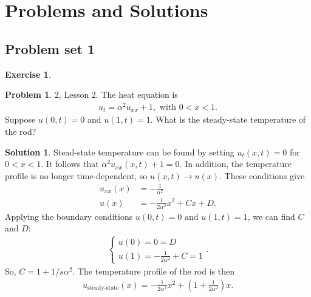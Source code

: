 \documentclass{article}
\theoremstyle{definition}
\newtheorem*{prob*}{Problem}
\newtheorem{exer}{Exercise}[section]
\newtheorem*{sln*}{Solution}
\begin{document}
\newpage

\section{Problems and Solutions}
\subsection{Problem set 1}
\begin{exer}
	\begin{prob*}2, Lesson 2.
		The heat equation is
		\begin{align*}
		u_t = \alpha^2 u_{xx} + 1, \text{ with }0 < x < 1.
		\end{align*}
		Suppose $u(0,t) = 0$ and $u(1,t) = 1$. What is the steady-state temperature of the rod?\\
		\begin{sln*}
			Stead-state temperature can be found by setting $u_t(x,t) = 0$ for $0 < x < 1$. It follows that $\alpha^2 u_{xx}(x,t) + 1 = 0$. In addition, the temperature profile is no longer time-dependent, so $u(x,t)\to u(x)$. These conditions give
			\begin{align*}
			u_{xx}(x) &= -\frac{1}{\alpha^2}\\
			u(x) &= -\frac{1}{2\alpha^2}x^2 + Cx + D.
			\end{align*} 
			Applying the boundary conditions $u(0,t)=0$ and $u(1,t)=1$, we can find $C$ and $D$:
			\begin{align*}
			\begin{cases}
			u(0) = 0 = D\\
			u(1) = -\frac{1}{2\alpha^2} + C = 1
			\end{cases}.
			\end{align*}
			So, $C = 1 + 1/s\alpha^2$. The temperature profile of the rod is then
			\begin{align*}
			u_{\text{steady-state}}(x) = -\frac{1}{2\alpha^2}x^2 + \left(1 + \frac{1}{2\alpha^2} \right)x .
			\end{align*}
		\end{sln*}
	\end{prob*}
	
	\newpage
	

\end{exer}
\end{document}
